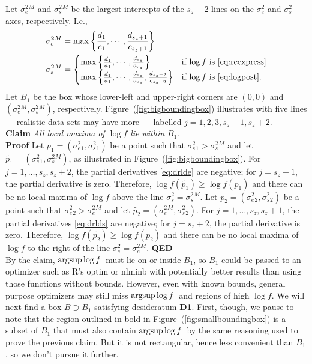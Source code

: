 \documentclass{report}
\newcommand{\textcompute}{\textsf}
\newcommand{\R}{\textcompute{R}\xspace}
\newcommand{\RL}{f}
\newcommand{\logRL}{\log\RL}
\newcommand{\sigssq}{\sigma_s^2}
\newcommand{\sigesq}{\sigma_e^2}
\newcommand{\mrle}{$\argsup\log f$}
\newcommand{\argsup}{\operatornamewithlimits{argsup}}
\begin{document}
Let $\sigesq{}^M$ and $\sigssq{}^M$ be the largest intercepts of the $s_z+2$ lines on the $\sigesq$ and $\sigssq$ axes, respectively.  I.e.,
\begin{align*}
  \sigesq{}^M &= \max \left\{ \frac{d_1}{c_1}, \cdots, \frac{d_{s_z+1}}{c_{s_z+1}} \right\}\\
  \sigssq{}^M &= \begin{cases}
                             \max \left\{ \frac{d_1}{a_1}, \cdots, \frac{d_{s_z}}{a_{s_z}} \right\} &
                                  \text{if $\logRL$ is \eqref{eq:reexpress}}\\
                             \max \left\{ \frac{d_1}{a_1}, \cdots, \frac{d_{s_z}}{a_{s_z}}, \frac{d_{s_z+2}}{c_{s_z+2}} \right\} &
                                  \text{if $\logRL$ is \eqref{eq:logpost}}.
                           \end{cases}
\end{align*}
Let $B_1$ be the box whose lower-left and upper-right corners are $(0,0)$ and $(\sigesq{}^M,\sigssq{}^M)$, respectively.  Figure~(\ref{fig:bigboundingbox}) illustrates with five lines --- realistic data sets may have more --- labelled $j=1, 2, 3, s_z+1, s_z+2$.\\
\textbf{Claim} \emph{All local maxima of $\logRL$ lie within $B_1$.}\\
\textbf{Proof} Let $p_1 = (\sigesq{}_1, \sigssq{}_1)$ be a point such that $\sigssq{}_1 > \sigssq{}^M$ and let $\widetilde{p_1} = (\sigesq{}_1, \sigssq{}^M)$, as illustrated in Figure~(\ref{fig:bigboundingbox}).  For $j=1, \dots, s_z, s_z+2$, the partial derivatives \eqref{eq:drlde} are negative; for $j=s_z+1$, the partial derivative is zero.  Therefore, $\logRL(\widetilde{p_1}) \ge \logRL(p_1)$ and there can be no local maxima of $\logRL$ above the line $\sigssq = \sigssq{}^M$.  Let $p_2 = (\sigesq{}_2, \sigssq{}_2)$ be a point such that $\sigesq{}_2 > \sigesq{}^M$ and let $\widetilde{p_2} = (\sigesq{}^M, \sigssq{}_2)$.  For $j=1, \dots, s_z, s_z+1$, the partial derivatives \eqref{eq:drlds} are negative; for $j=s_z+2$, the partial derivative is zero.   Therefore, $\logRL(\widetilde{p_2}) \ge \logRL(p_2)$ and there can be no local maxima of $\logRL$ to the right of the line $\sigesq = \sigesq{}^M$.  \textbf{QED}\\

By the claim, \mrle\ must lie on or inside $B_1$, so $B_1$ could be passed to an optimizer such as \R's \textsf{optim} or \textsf{nlminb} with potentially better results than using those functions without bounds.  However, even with known bounds, general purpose optimizers may still miss \mrle\ and regions of high $\logRL$.  We will next find a box $B \supset B_1$ satisfying desideratum \textbf{D1}.  First, though, we pause to note that the region outlined in bold in Figure~(\ref{fig:smallboundingbox}) is a subset of $B_1$ that must also contain \mrle\ by the same reasoning used to prove the previous claim.  But it is not rectangular, hence less convenient than $B_1$, so we don't pursue it further.
\end{document}
